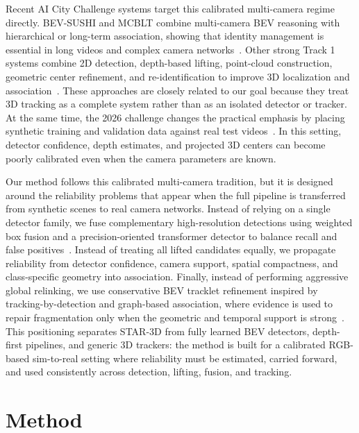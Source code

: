 \documentclass[runningheads]{llncs}
\begin{document}
Recent AI City Challenge systems target this calibrated multi-camera regime
directly. BEV-SUSHI and MCBLT combine multi-camera BEV reasoning with hierarchical
or long-term association, showing that identity management is essential in long
videos and complex camera networks~\cite{wang2024bevsushi,wang2025mcblt}. Other
strong Track 1 systems combine 2D detection, depth-based lifting, point-cloud
construction, geometric center refinement, and re-identification to improve 3D
localization and association~\cite{phan2025vgcrtrack,tran2025depthtrack,
vuminh2025online3d,lee2025pointcloud}. These approaches are closely related to our
goal because they treat 3D tracking as a complete system rather than as an isolated
detector or tracker. At the same time, the 2026 challenge changes the practical
emphasis by placing synthetic training and validation data against real test
videos~\cite{aicity2026track1}. In this setting, detector confidence, depth
estimates, and projected 3D centers can become poorly calibrated even when the
camera parameters are known.

Our method follows this calibrated multi-camera tradition, but it is designed
around the reliability problems that appear when the full pipeline is transferred
from synthetic scenes to real camera networks. Instead of relying on a single
detector family, we fuse complementary high-resolution detections using weighted
box fusion and a precision-oriented transformer detector to balance recall and
false positives~\cite{solovyev2021wbf,peng2025dfine}. Instead of treating all
lifted candidates equally, we propagate reliability from detector confidence,
camera support, spatial compactness, and class-specific geometry into association.
Finally, instead of performing aggressive global relinking, we use conservative
BEV tracklet refinement inspired by tracking-by-detection and graph-based
association, where evidence is used to repair fragmentation only when the
geometric and temporal support is strong~\cite{zhou2020centertrack,
zhang2022bytetrack,cetintas2023sushi}. This positioning separates STAR-3D from
fully learned BEV detectors, depth-first pipelines, and generic 3D trackers: the
method is built for a calibrated RGB-based sim-to-real setting where reliability
must be estimated, carried forward, and used consistently across detection,
lifting, fusion, and tracking.

\section{Method}
\label{sec:method}
\end{document}
